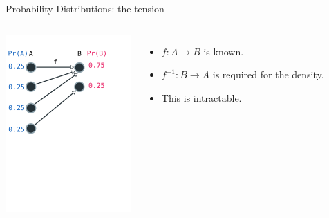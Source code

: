 \documentclass{beamer}
\begin{document}
\begin{frame}[fragile]{Probability Distributions: the tension}
    \begin{columns}
        \includegraphics[height=256px]{res/density-forward.pdf}
        \begin{itemize}
            \item $f: A \rightarrow B$ is known.
            \item $f^{-1}: B \rightarrow A$ is required for the density.
            \item This is intractable.
        \end{itemize}
    \end{columns}
\end{frame}
\end{document}

